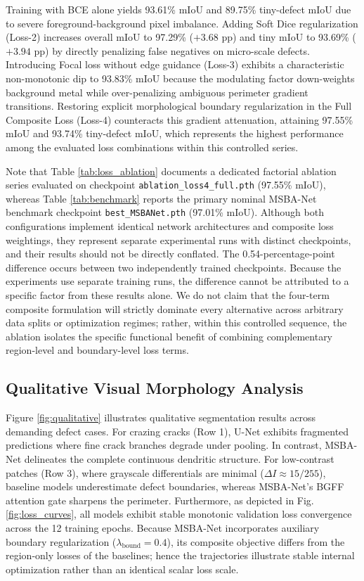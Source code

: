 \documentclass{ieeeaccess}
\begin{document}
Training with BCE alone yields 93.61\% mIoU and 89.75\% tiny-defect mIoU due to severe foreground-background pixel imbalance. Adding Soft Dice regularization (Loss-2) increases overall mIoU to 97.29\% ($+3.68\text{ pp}$) and tiny mIoU to 93.69\% ($+3.94\text{ pp}$) by directly penalizing false negatives on micro-scale defects. Introducing Focal loss without edge guidance (Loss-3) exhibits a characteristic non-monotonic dip to 93.83\% mIoU because the modulating factor down-weights background metal while over-penalizing ambiguous perimeter gradient transitions. Restoring explicit morphological boundary regularization in the Full Composite Loss (Loss-4) counteracts this gradient attenuation, attaining 97.55\% mIoU and 93.74\% tiny-defect mIoU, which represents the highest performance among the evaluated loss combinations within this controlled series.

Note that Table \ref{tab:loss_ablation} documents a dedicated factorial ablation series evaluated on checkpoint \texttt{ablation\_\allowbreak loss4\_\allowbreak full.pth} (97.55\% mIoU), whereas Table \ref{tab:benchmark} reports the primary nominal MSBA-Net benchmark checkpoint \texttt{best\_MSBANet.pth} (97.01\% mIoU). Although both configurations implement identical network architectures and composite loss weightings, they represent separate experimental runs with distinct checkpoints, and their results should not be directly conflated. The 0.54-percentage-point difference occurs between two independently trained checkpoints. Because the experiments use separate training runs, the difference cannot be attributed to a specific factor from these results alone. We do not claim that the four-term composite formulation will strictly dominate every alternative across arbitrary data splits or optimization regimes; rather, within this controlled sequence, the ablation isolates the specific functional benefit of combining complementary region-level and boundary-level loss terms.

\subsection{Qualitative Visual Morphology Analysis}
Figure \ref{fig:qualitative} illustrates qualitative segmentation results across demanding defect cases. For crazing cracks (Row 1), U-Net exhibits fragmented predictions where fine crack branches degrade under pooling. In contrast, MSBA-Net delineates the complete continuous dendritic structure. For low-contrast patches (Row 3), where grayscale differentials are minimal ($\Delta I \approx 15/255$), baseline models underestimate defect boundaries, whereas MSBA-Net's BGFF attention gate sharpens the perimeter. Furthermore, as depicted in Fig. \ref{fig:loss_curves}, all models exhibit stable monotonic validation loss convergence across the 12 training epochs. Because MSBA-Net incorporates auxiliary boundary regularization ($\lambda_{\text{bound}}=0.4$), its composite objective differs from the region-only losses of the baselines; hence the trajectories illustrate stable internal optimization rather than an identical scalar loss scale.
\end{document}
